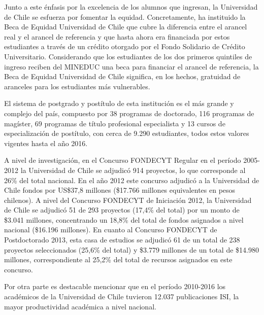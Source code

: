 Junto a este énfasis por la excelencia de los alumnos que ingresan, la Universidad de Chile se
esfuerza por fomentar la equidad. Concretamente, ha instituido la Beca de Equidad Universidad de
Chile que cubre la diferencia entre el arancel real y el arancel de referencia y que hasta ahora era
financiada por estos estudiantes a través de un crédito otorgado por el Fondo Solidario de Crédito
Universitario. Considerando que los estudiantes de los dos primeros quintiles de ingreso reciben
del MINEDUC una beca para financiar el arancel de referencia, la Beca de Equidad Universidad
de Chile significa, en los hechos, gratuidad de aranceles para los estudiantes más vulnerables.


El sistema de postgrado y postítulo de esta institución es el más grande y complejo del país,
compuesto por 38 programas de doctorado, 116 programas de magíster, 69 programas de título
profesional especialista y 13 cursos de especialización de postítulo, con cerca de 9.290 estudiantes,
todos estos valores vigentes hasta el año 2016.

A nivel de investigación, en el Concurso FONDECYT Regular en el período 2005-2012 la
Universidad de Chile se adjudicó 914 proyectos, lo que corresponde al 26\% del total nacional.
En el año 2012 este concurso adjudicó a la Universidad de Chile fondos por US\$37,8 millones
(\$17.766 millones equivalentes en pesos chilenos). A nivel del Concurso FONDECYT de Iniciación 2012, la
Universidad de Chile se adjudicó 51 de 293 proyectos (17,4\% del total) por un monto de \$3.041
millones, concentrando un 18,8\% del total de fondos asignados a nivel nacional (\$16.196 millones). En
cuanto al Concurso FONDECYT de Postdoctorado 2013, esta casa de estudios se adjudicó 61
de un total de 238 proyectos seleccionados (25,6\% del total) y \$3.779 millones de un total de
\$14.980 millones, correspondiente al 25,2\% del total de recursos asignados en este concurso.

Por otra parte es destacable mencionar que en el período 2010-2016 los académicos de la
Universidad de Chile tuvieron 12.037 publicaciones ISI, la mayor productividad académica a nivel nacional.


